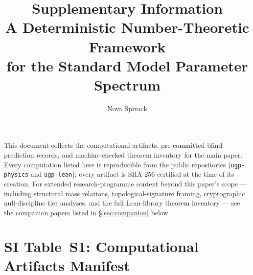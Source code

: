 \documentclass[10pt]{article}
\title{\bfseries Supplementary Information\\[4pt]
\large A Deterministic Number-Theoretic Framework\\for the Standard Model Parameter Spectrum}
\author{Nova Spivack}
\date{}
\begin{document}
\maketitle

This document collects the computational artifacts, pre-committed blind-prediction records, and machine-checked theorem inventory for the main paper.  Every computation listed here is reproducible from the public repositories (\texttt{ugp-physics} and \texttt{ugp-lean}); every artifact is SHA-256 certified at the time of its creation.  For extended research-programme content beyond this paper's scope --- including structural mass relations, topological-signature framing, cryptographic null-discipline tier analyses, and the full Lean-library theorem inventory --- see the companion papers listed in \S\ref{sec:companion} below.

\section*{SI Table~S1: Computational Artifacts Manifest}
\end{document}
